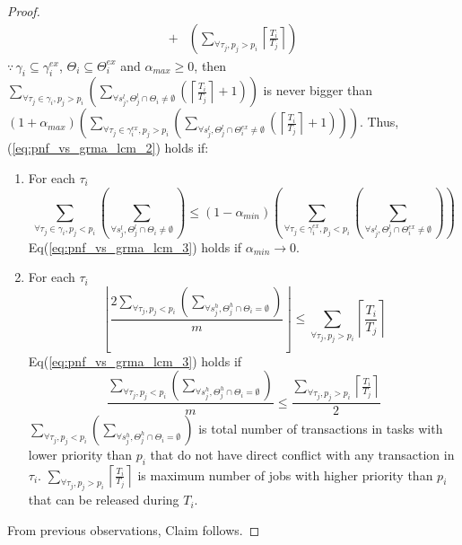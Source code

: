\begin{proof}
\begin{eqnarray}
+ & \left(\sum_{\forall\tau_{j},p_{j}>p_{i}}\left\lceil \frac{T_{i}}{T_{j}}\right\rceil \right)\label{eq:pnf_vs_grma_lcm_2}
\end{eqnarray}
%
$\because\,\gamma_{i}\subseteq\gamma_{i}^{ex}$, $\Theta_{i}\subseteq\Theta_{i}^{ex}$
and $\alpha_{max}\ge0$, then $\sum_{\forall\tau_{j}\in\gamma_{i},p_{j}>p_{i}}\left(\sum_{\forall s_{j}^{l},\Theta_{j}^{l}\cap\Theta_{i}\neq\emptyset}\left(\left\lceil \frac{T_{i}}{T_{j}}\right\rceil +1\right)\right)$
is never bigger than $\left(1+\alpha_{max}\right)\left(\sum_{\forall\tau_{j}\in\gamma_{i}^{ex},p_{j}>p_{i}}\left(\sum_{\forall s_{j}^{l},\Theta_{j}^{l}\cap\Theta_{i}^{ex}\neq\emptyset}\left(\left\lceil \frac{T_{i}}{T_{j}}\right\rceil +1\right)\right)\right)$.
Thus, (\ref{eq:pnf_vs_grma_lcm_2}) holds if:
%
\begin{enumerate}
\item For each $\tau_{i}$ 
\begin{equation}
\sum_{\forall\tau_{j}\in\gamma_{i},p_{j}<p_{i}}\left(\sum_{\forall s_{j}^{l},\Theta_{j}^{l}\cap\Theta_{i}\neq\emptyset}\right)\le\left(1-\alpha_{min}\right)\left(\sum_{\forall\tau_{j}\in\gamma_{i}^{ex},p_{j}<p_{i}}\left(\sum_{\forall s_{j}^{l},\Theta_{j}^{l}\cap\Theta_{i}^{ex}\neq\emptyset}\right)\right)\label{eq:pnf_vs_grma_lcm_3}
\end{equation}
%
Eq(\ref{eq:pnf_vs_grma_lcm_3}) holds if $\alpha_{min}\rightarrow0$.
%
\item For each $\tau_{i}$ 
\begin{equation}
\left\lfloor \frac{2\sum_{\forall\tau_{j},p_{j}<p_{i}}\left(\sum_{\forall s_{j}^{h},\Theta_{j}^{h}\cap\Theta_{i}=\emptyset}\right)}{m}\right\rfloor \le\sum_{\forall\tau_{j},p_{j}>p_{i}}\left\lceil \frac{T_{i}}{T_{j}}\right\rceil \label{eq:pnf_vs_grma_lcm_4}
\end{equation}
Eq(\ref{eq:pnf_vs_grma_lcm_3}) holds if 
\[
\frac{\sum_{\forall\tau_{j},p_{j}<p_{i}}\left(\sum_{\forall s_{j}^{h},\Theta_{j}^{h}\cap\Theta_{i}=\emptyset}\right)}{m}\le\frac{\sum_{\forall\tau_{j},p_{j}>p_{i}}\left\lceil \frac{T_{i}}{T_{j}}\right\rceil }{2}
\]
$\sum_{\forall\tau_{j},p_{j}<p_{i}}\left(\sum_{\forall s_{j}^{h},\Theta_{j}^{h}\cap\Theta_{i}=\emptyset}\right)$
is total number of transactions in tasks with lower priority than
$p_{i}$ that do not have direct conflict with any transaction in $\tau_i$. $\sum_{\forall\tau_{j},p_{j}>p_{i}}\left\lceil \frac{T_{i}}{T_{j}}\right\rceil $
is maximum number of jobs with higher priority than $p_{i}$ that can
be released during $T_{i}$.
\end{enumerate}
%
From previous observations, Claim follows.
%
\end{proof}
%
